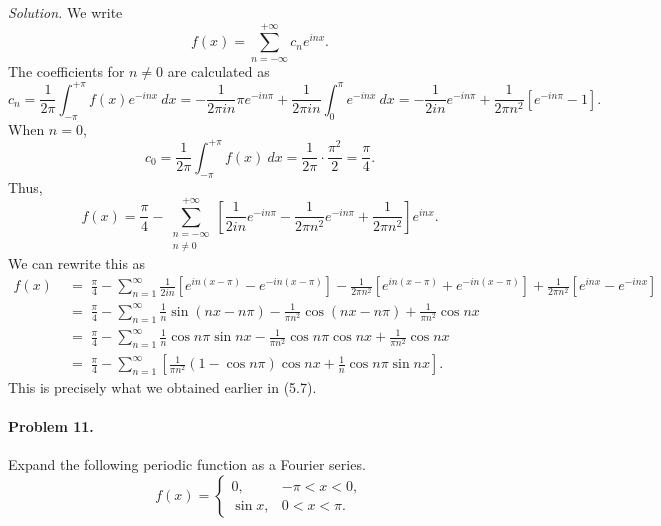 \documentclass[10pt]{article}
\begin{document}
        \textit{Solution.} We write
        \[
                f(x) = \sum_{n = -\infty}^{+\infty} c_n e^{inx}.
        \]
        The coefficients for $n \neq 0$ are calculated as
        \[
                c_n = \frac{1}{2\pi} \int_{-\pi}^{+\pi} f(x)e^{-inx}\:dx = -\frac{1}{2\pi in}\pi e^{-in\pi} + \frac{1}{2\pi i n}\int_0^\pi e^{-inx}\:dx
                        = -\frac{1}{2in}e^{-in\pi} + \frac{1}{2\pi n^2}\left[e^{-in\pi} - 1\right].
        \]
        When $n = 0$,
        \[
                c_0 = \frac{1}{2\pi}\int_{-\pi}^{+\pi} f(x)\:dx = \frac{1}{2\pi}\cdot \frac{\pi^2}{2} = \frac{\pi}{4}.
        \]
        Thus,
        \[
                f(x) = \frac{\pi}{4} - \sum_{\substack{n = -\infty\\ n \neq 0}}^{+\infty} \left[\frac{1}{2in}e^{-in\pi} - 
                        \frac{1}{2\pi n^2}e^{-in\pi} + \frac{1}{2\pi n^2} \right]e^{inx}.
        \]
        We can rewrite this as 
        \begin{align*}
                f(x) \;&=\; \frac{\pi}{4} - \sum_{n = 1}^\infty \frac{1}{2in}\left[e^{in(x - \pi)} - e^{-in(x - \pi)}\right] -
                        \frac{1}{2\pi n^2}\left[e^{in(x - \pi)} + e^{-in(x - \pi)}\right] + \frac{1}{2\pi n^2}\left[e^{inx} - e^{-inx}\right] \\
                        \;&=\; \frac{\pi}{4} - \sum_{n = 1}^\infty \frac{1}{n}\sin(nx - n\pi) -
                                \frac{1}{\pi n^2}\cos(nx - n\pi) + \frac{1}{\pi n^2}\cos{nx} \\
                        \;&=\; \frac{\pi}{4} - \sum_{n = 1}^\infty \frac{1}{n}\cos{n\pi}\sin{nx} -
                                \frac{1}{\pi n^2}\cos{n\pi}\cos{nx} + \frac{1}{\pi n^2}\cos{nx} \\
                        \;&=\; \frac{\pi}{4} - \sum_{n = 1}^\infty\left[ \frac{1}{\pi n^2}(1 - \cos{n\pi})\cos{nx} + \frac{1}{n}\cos{n\pi}\sin{nx} \right].
        \end{align*}
        This is precisely what we obtained earlier in (5.7).

        \paragraph{Problem 11.} Expand the following periodic function as a Fourier series.
        \[
                f(x) = \begin{cases}
                        0, & -\pi < x < 0,      \\
                        \sin{x}, & 0 < x < \pi.
                \end{cases}
        \]
        
\end{document}
